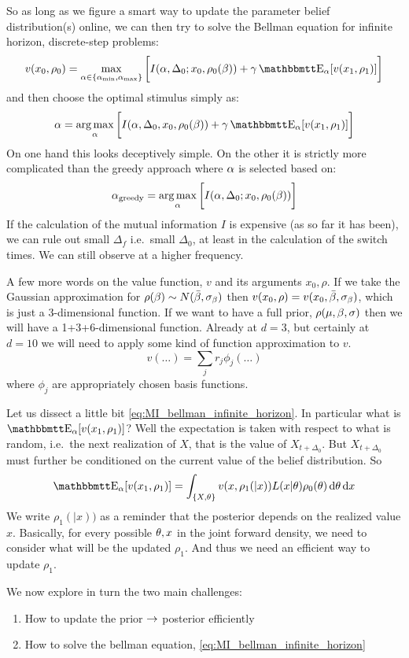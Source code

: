 \documentclass{article}
\begin{document}
So as long as we figure a smart way to update the parameter belief
distribution(s) online, we can then try to solve the Bellman equation for
infinite horizon, discrete-step problems:
\begin{equation}
v(x_0, \rho_0) = \max_{\a \in \{\amin, \amax\}}  \bigg[ I(\a, \Delta_0; x_0,
\rho_0(\b)) + \g \Exp_\a [ v(x_1, \rho_1)] \bigg] 
\label{eq:MI_bellman_infinite_horizon}
\end{equation}
and then choose the optimal stimulus simply as:
$$
\a = \argmax_\a \bigg[ I(\a,  \Delta_0, x_0, \rho_0(\b)) +
		 \g \Exp_\a [ v(x_1, \rho_1)] \bigg]
$$
On one hand this looks deceptively simple. On the other it is strictly 
more complicated than the greedy approach where ${\alpha}$ is selected 
based on:
$$
\a_{\textrm{greedy}} = \argmax_\a \bigg[ I(\a,  \Delta_0; x_0, \rho_0(\b))\bigg]
$$ 
If the calculation of the mutual information $I$ is expensive (as so far it has
been), we can rule out small $\Delta_f$ i.e.\ small $\Delta_0$, at least in the calculation of the
switch times. We can still observe at a higher frequency.

A few more words on the value function, $v$ and its arguments $x_0, \rho$. If we
take the Gaussian approximation for $\rho({\beta}) \sim N(\bar \beta, \sigma_{\beta})$
then $v(x_0, \rho) = v(x_0, \bar \beta, \sigma_{\beta})$, which is just a
3-dimensional function. If we want to have a full prior, $\rho({\mu }, {\beta}, {\sigma })$ then
we will have a 1+3+6-dimensional function. Already at $d=3$, but certainly at
$d=10$ we will need to apply some kind of function approximation to $v$. 
$$v(\ldots) = \sum_j r_j \phi_j (\ldots)$$
where $\phi_j$ are appropriately chosen basis functions. 

Let us dissect  a little bit \cref{eq:MI_bellman_infinite_horizon}. In
particular what is $\Exp_\a [ v(x_1, \rho_1)]$? Well the expectation is taken
with respect to what is random, i.e.\ the next realization of $X$, that is the
value of $X_{t+\Delta_0}$. But $X_{t+\Delta_0}$ must further be conditioned on
the current value of the belief distribution.  
So
$$ \Exp_\a [ v(x_1, \rho_1)] =
\int_{\{X, \th\}} v(x, \rho_1(|x)) L(x|\th) \rho_0(\th)
\intd{\th}
\intd{x}
$$
We write $\rho_1(|x))$ as a reminder that the posterior depends on the
realized value $x$. Basically, for every possible ${\theta}, x$ in the joint
forward density, we need to consider what will be the updated $\rho_1$. And thus
we need an efficient way to update $\rho_1$. 

We now explore in turn the two main challenges:

\begin{enumerate}
  \item How to update the prior ${\rightarrow}$ posterior efficiently
  \item How to solve the bellman equation, \cref{eq:MI_bellman_infinite_horizon}
\end{enumerate}
\end{document}
